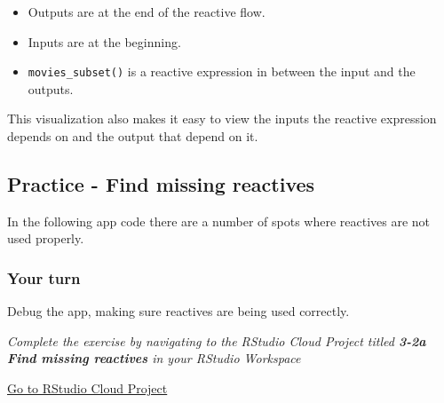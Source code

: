 \documentclass[
  letterpaper,
  DIV=11,
  numbers=noendperiod]{scrreprt}
\providecommand{\tightlist}{%
  \setlength{\itemsep}{0pt}\setlength{\parskip}{0pt}}
\begin{document}
\begin{itemize}
\tightlist
\item
  Outputs are at the end of the reactive flow.
\item
  Inputs are at the beginning.\\
\item
  \texttt{movies\_subset()} is a reactive expression in between the
  input and the outputs.
\end{itemize}

This visualization also makes it easy to view the inputs the reactive
expression depends on and the output that depend on it.

\hypertarget{practice---find-missing-reactives}{%
\subsection{Practice - Find missing
reactives}\label{practice---find-missing-reactives}}

In the following app code there are a number of spots where reactives
are not used properly.

\hypertarget{your-turn-21}{%
\subsubsection{Your turn}\label{your-turn-21}}

Debug the app, making sure reactives are being used correctly.

\emph{Complete the exercise by navigating to the RStudio Cloud Project
titled \textbf{3-2a Find missing reactives} in your RStudio Workspace}

\href{https://rstudio.cloud/spaces/81721/join?access_code=I4VJaNsKfTqR3Td9hLP7E1nz8\%2FtMg6Xbw9Bgqumv}{
Go to RStudio Cloud Project}
\end{document}
